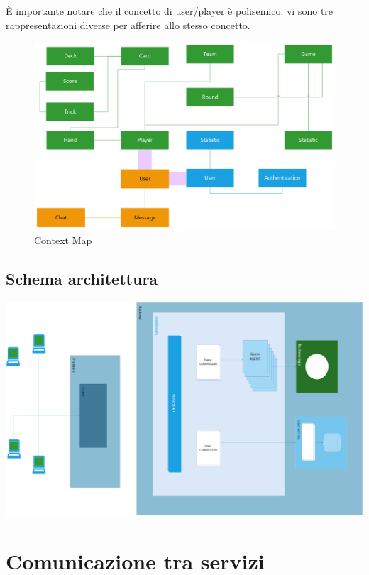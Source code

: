 È importante notare che il concetto di user/player è polisemico: vi sono tre rappresentazioni diverse per afferire allo stesso concetto.
\begin{figure}[h!]
    \centering 
    \includegraphics[scale=0.75]{report/img/BoundedCTX.png}
    \caption{Context Map}
    \label{bounded_context}
\end{figure}
\newpage


\subsection{Schema architettura}

\includegraphics[width=16cm]{report/img/Architecture.png}\\[8.5cm]


\newpage
\section{Comunicazione tra servizi}

